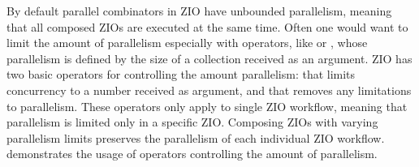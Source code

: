 

By default parallel combinators in ZIO have unbounded parallelism, meaning that all composed ZIOs are executed at the same time. Often one would want to limit the amount of parallelism especially with operators, like  or , whose parallelism is defined by the size of a collection received as an argument. ZIO has two basic operators for controlling the amount parallelism:  that limits concurrency to a number received as argument, and  that removes any limitations to parallelism. These operators only apply to single ZIO workflow, meaning that parallelism is limited only in a specific ZIO. Composing ZIOs with varying parallelism limits preserves the parallelism of each individual ZIO workflow.  demonstrates the usage of operators controlling the amount of parallelism.





